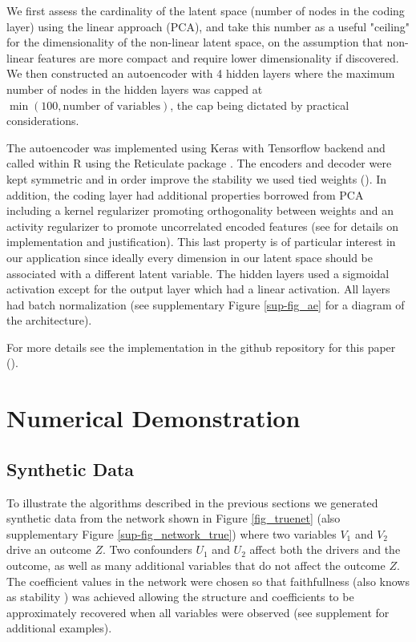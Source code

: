 \documentclass[letterpaper]{article}
\begin{document}
We first assess the cardinality of the latent space (number of nodes in the coding layer) using the linear approach (PCA), and take this number as a useful "ceiling" for the dimensionality of the non-linear latent space, on the assumption that non-linear features are more compact and require lower dimensionality if discovered.  We then constructed an autoencoder with 4 hidden layers where the maximum number of nodes in the hidden layers was capped at $\min (100, \textrm{number of variables})$, the cap being dictated by practical considerations.

The autoencoder was implemented using Keras with Tensorflow backend and called within R using the Reticulate package \cite{reticulate_2020}. The encoders and decoder were kept symmetric and in order improve the stability we used tied weights (\cite{pca_ae}). In addition, the coding layer had additional properties borrowed from PCA including a kernel regularizer promoting orthogonality between weights and an activity regularizer to promote uncorrelated encoded features (see \cite{ranjan_build_2019} for details on implementation and justification). This last property is of particular interest in our application since ideally every dimension in our latent space should be associated with a different latent variable. The hidden layers used a sigmoidal activation except for the output layer which had a linear activation. All layers had batch normalization \cite{ioffe2015batch} (see supplementary Figure \ref{sup-fig_ae} for a diagram of the architecture).

For more details see the implementation in the github repository for this paper (\cite{latent_2020}).

\section{Numerical Demonstration}
\subsection{Synthetic Data}
To illustrate  the algorithms described in the previous sections we
generated synthetic data from the network shown in Figure
\ref{fig_truenet} (also supplementary Figure \ref{sup-fig_network_true}) where two variables $V_1$ and $V_2$ drive an outcome
$Z$. Two confounders $U_1$ and $U_2$ affect both the drivers and the
outcome, as well as many additional variables that do not affect the
outcome $Z$.
The coefficient values in the network were chosen so that faithfullness (also knows as stability \cite{pearl_causality:_2000}) was achieved allowing the structure and coefficients to be  approximately recovered when all variables were observed (see supplement for additional examples).
\end{document}
